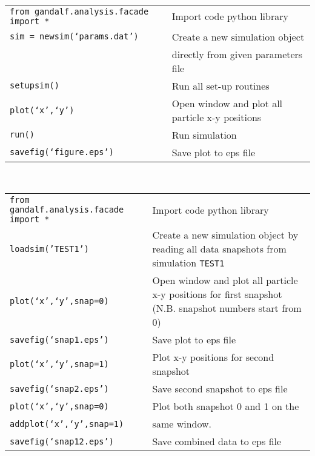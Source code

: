 \documentclass[a4paper]{article}
\newcommand{\var}[1]{\texttt{#1}}
\begin{document}
 \\
\newline
\begin{tabular}{p{8.0cm}p{7.0cm}}
\var{from gandalf.analysis.facade import *}& Import code python library \\
\var{sim = newsim(`params.dat')}           & Create a new simulation object \\
                                           & directly from given parameters file \\
\var{setupsim()}                           & Run all set-up routines \\
\var{plot(`x',`y')}                        & Open window and plot all particle x-y positions \\
\var{run()}                                & Run simulation \\
\var{savefig(`figure.eps')}                & Save plot to eps file
\end{tabular}
\vspace{1cm}

 \\
\newline
\begin{tabular}{p{8.0cm}p{7.0cm}}
\var{from gandalf.analysis.facade import *}& Import code python library \\
\var{loadsim('TEST1')}                     & Create a new simulation object by reading all data snapshots from simulation \var{TEST1} \\
\var{plot(`x',`y',snap=0)}                 & Open window and plot all particle x-y positions for first snapshot (N.B. snapshot numbers start from 0) \\
\var{savefig(`snap1.eps')}                 & Save plot to eps file \\
\var{plot(`x',`y',snap=1)}                 & Plot x-y positions for second snapshot \\
\var{savefig(`snap2.eps')}                 & Save second snapshot to eps file \\
\var{plot(`x',`y',snap=0)}                 & Plot both snapshot 0 and 1 on the \\
\var{addplot(`x',`y',snap=1)}              & same window. \\
\var{savefig(`snap12.eps')}                & Save combined data to eps file
\end{tabular}
\vspace{1cm}
\end{document}
